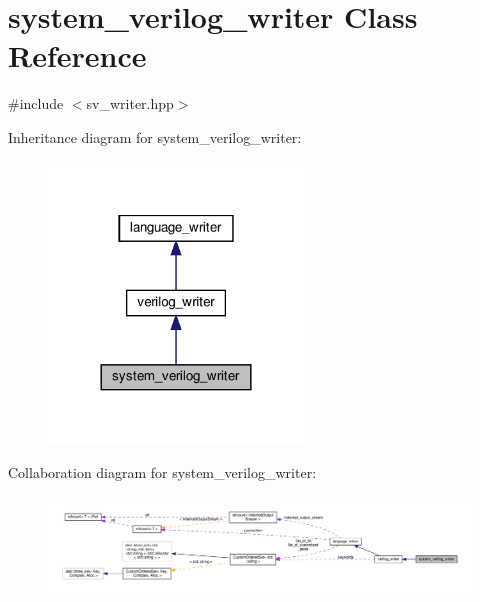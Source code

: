 \hypertarget{classsystem__verilog__writer}{}\section{system\+\_\+verilog\+\_\+writer Class Reference}
\label{classsystem__verilog__writer}


{\ttfamily \#include $<$sv\+\_\+writer.\+hpp$>$}



Inheritance diagram for system\+\_\+verilog\+\_\+writer\+:
\nopagebreak
\begin{figure}[H]
\begin{center}
\leavevmode
\includegraphics[width=192pt]{dd/db6/classsystem__verilog__writer__inherit__graph}
\end{center}
\end{figure}


Collaboration diagram for system\+\_\+verilog\+\_\+writer\+:
\nopagebreak
\begin{figure}[H]
\begin{center}
\leavevmode
\includegraphics[width=350pt]{d8/dcf/classsystem__verilog__writer__coll__graph}
\end{center}
\end{figure}
